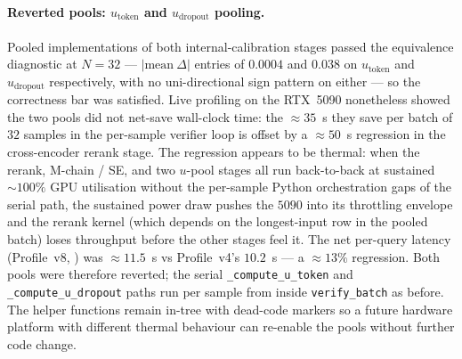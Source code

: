\paragraph{Reverted pools: $u_{\text{token}}$ and $u_{\text{dropout}}$ pooling.}
\label{par:perf-u-pools-thermal}
Pooled implementations of both internal-calibration stages passed the
equivalence diagnostic at $N = 32$ --- $|\text{mean}\ \Delta|$
entries of $0.0004$ and $0.038$ on $u_{\text{token}}$ and
$u_{\text{dropout}}$ respectively, with no uni-directional sign
pattern on either --- so the correctness bar was satisfied. Live
profiling on the RTX~5090 nonetheless showed the two pools did not
net-save wall-clock time: the $\approx 35$~s they save per batch of
$32$ samples in the per-sample verifier loop is offset by a
$\approx 50$~s regression in the cross-encoder rerank stage. The
regression appears to be thermal: when the rerank, M-chain / SE, and
two $u$-pool stages all run back-to-back at sustained $\sim\!100\%$
GPU utilisation without the per-sample Python orchestration gaps of
the serial path, the sustained power draw pushes the $5090$ into its
throttling envelope and the rerank kernel (which depends on the
longest-input row in the pooled batch) loses throughput before the
other stages feel it. The net per-query latency (Profile~v8,
) was $\approx 11.5$~s vs
Profile~v4's $10.2$~s --- a $\approx 13\%$ regression. Both pools
were therefore reverted; the serial \texttt{\_compute\_u\_token} and
\texttt{\_compute\_u\_dropout} paths run per sample from inside
\texttt{verify\_batch} as before. The helper functions remain in-tree
with dead-code markers so a future hardware platform with different
thermal behaviour can re-enable the pools without further code
change.


